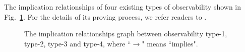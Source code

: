 The implication relationships of four existing types of observability shown in Fig.~\ref{fig:9}. For the details of its proving process, we refer readers to \cite{Zhang2016Observability}.

 \begin{figure}[thpb]
      \centering
      
      \caption{The implication relationships graph between observability type-1, type-2, type-3 and type-4, where ``$\rightarrow$" means ``implies".}
      \label{fig:9}
   \end{figure}

   


